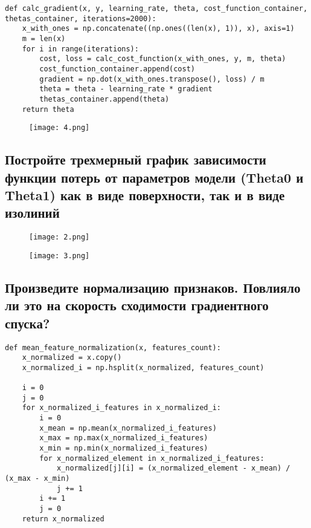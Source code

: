 \begin{lstlisting}
def calc_gradient(x, y, learning_rate, theta, cost_function_container, thetas_container, iterations=2000):
    x_with_ones = np.concatenate((np.ones((len(x), 1)), x), axis=1)
    m = len(x)
    for i in range(iterations):
        cost, loss = calc_cost_function(x_with_ones, y, m, theta)
        cost_function_container.append(cost)
        gradient = np.dot(x_with_ones.transpose(), loss) / m
        theta = theta - learning_rate * gradient
        thetas_container.append(theta)
    return theta
\end{lstlisting}

\begin{figure}[h]
\centering
	\texttt{[image: 4.png]}
	\label{sec:purpose:payings}
\end{figure}

\subsection{Постройте трехмерный график зависимости функции потерь от параметров модели (Theta0 и Theta1) как в виде поверхности, так и в виде изолиний}

\begin{figure}[h]
\centering
	\texttt{[image: 2.png]}
	\label{sec:purpose:payings}
\end{figure}

\begin{figure}[h]
\centering
	\texttt{[image: 3.png]}
	\label{sec:purpose:payings}
\end{figure}

\subsection{Произведите нормализацию признаков. Повлияло ли это на скорость сходимости градиентного спуска?}

\begin{lstlisting}
def mean_feature_normalization(x, features_count):
    x_normalized = x.copy()
    x_normalized_i = np.hsplit(x_normalized, features_count)
  
    i = 0
    j = 0
    for x_normalized_i_features in x_normalized_i:
        i = 0
        x_mean = np.mean(x_normalized_i_features)
        x_max = np.max(x_normalized_i_features)
        x_min = np.min(x_normalized_i_features)
        for x_normalized_element in x_normalized_i_features:
            x_normalized[j][i] = (x_normalized_element - x_mean) / (x_max - x_min)
            j += 1
        i += 1
        j = 0
    return x_normalized
\end{lstlisting}

